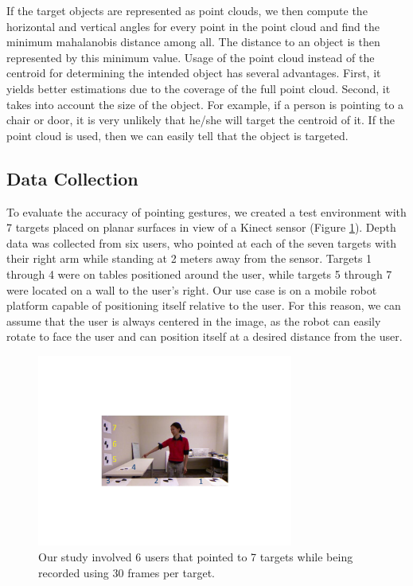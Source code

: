\documentclass[12pt]{gatech-thesis}
\begin{document}
If the target objects are represented as point clouds, we then compute the horizontal and vertical angles for every point in the point cloud and find the minimum mahalanobis distance among all. The distance to an object is then represented by this minimum value. Usage of the point cloud instead of the centroid for determining the intended object has several advantages. First, it yields better estimations due to the coverage of the full point cloud. Second, it takes into account the size of the object. For example, if a person is pointing to a chair or door, it is very unlikely that he/she will target the centroid of it. If the point cloud is used, then we can easily tell that the object is targeted.

 
\subsection{Data Collection}
\label{sec:pointing_data_collection}

To evaluate the accuracy of pointing gestures, we created a test environment with 7 targets placed on planar surfaces in view of a Kinect sensor (Figure \ref{fig:ground_truth_targets}). Depth data was collected from six users, who pointed at each of the seven targets with their right arm while standing at 2 meters away from the sensor. Targets 1 through 4 were on tables positioned around the user, while targets 5 through 7 were located on a wall to the user's right. Our use case is on a mobile robot platform capable of positioning itself relative to the user.  For this reason, we can assume that the user is always centered in the image, as the robot can easily rotate to face the user and can position itself at a desired distance from the user.

\begin{figure}[ht!]
\centering
\includegraphics[width=0.75\textwidth]{pics/data_collection_crop}
\caption{Our study involved 6 users that pointed to 7 targets while being recorded using 30 frames per target.}
\label{fig:ground_truth_targets}
\end{figure}
\end{document}
